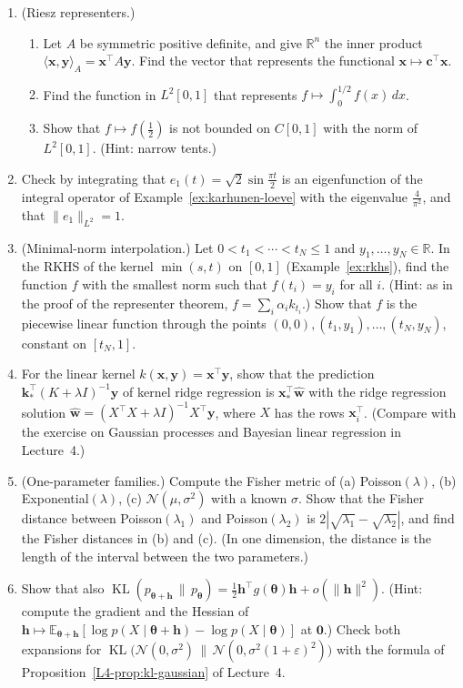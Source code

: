 \documentclass[11pt]{article}
\newcommand{\norm}[1]{\lVert #1 \rVert}
\newcommand{\ip}[2]{\langle #1, #2 \rangle}
\newcommand{\E}{\mathbb{E}}
\theoremstyle{definition}
\theoremstyle{plain}
\theoremstyle{remark}
\DeclareMathOperator{\KL}{KL}
\begin{document}
\begin{enumerate}[leftmargin=*]
    \item (Riesz representers.)
    \begin{enumerate}[label=(\alph*)]
        \item Let $A$ be symmetric positive definite, and give $\mathbb{R}^n$ the inner product $\ip{\mathbf{x}}{\mathbf{y}}_A = \mathbf{x}^\top A\mathbf{y}$. Find the vector that represents the functional $\mathbf{x} \mapsto \mathbf{c}^\top\mathbf{x}$.
        \item Find the function in $L^2[0, 1]$ that represents $f \mapsto \int_0^{1/2} f(x)\, dx$.
        \item Show that $f \mapsto f(\frac{1}{2})$ is not bounded on $C[0, 1]$ with the norm of $L^2[0, 1]$. (Hint: narrow tents.)
    \end{enumerate}
    \item Check by integrating that $e_1(t) = \sqrt{2}\sin\frac{\pi t}{2}$ is an eigenfunction of the integral operator of Example~\ref{ex:karhunen-loeve} with the eigenvalue $\frac{4}{\pi^2}$, and that $\norm{e_1}_{L^2} = 1$.
    \item (Minimal-norm interpolation.) Let $0 < t_1 < \cdots < t_N \leq 1$ and $y_1, \ldots, y_N \in \mathbb{R}$. In the RKHS of the kernel $\min(s, t)$ on $[0, 1]$ (Example~\ref{ex:rkhs}), find the function $f$ with the smallest norm such that $f(t_i) = y_i$ for all $i$. (Hint: as in the proof of the representer theorem, $f = \sum_i \alpha_ik_{t_i}$.) Show that $f$ is the piecewise linear function through the points $(0, 0), (t_1, y_1), \ldots, (t_N, y_N)$, constant on $[t_N, 1]$.
    \item For the linear kernel $k(\mathbf{x}, \mathbf{y}) = \mathbf{x}^\top\mathbf{y}$, show that the prediction $\mathbf{k}_*^\top(K + \lambda I)^{-1}\mathbf{y}$ of kernel ridge regression is $\mathbf{x}_*^\top\hat{\mathbf{w}}$ with the ridge regression solution $\hat{\mathbf{w}} = (X^\top X + \lambda I)^{-1}X^\top\mathbf{y}$, where $X$ has the rows $\mathbf{x}_i^\top$. (Compare with the exercise on Gaussian processes and Bayesian linear regression in Lecture~4.)
    \item (One-parameter families.) Compute the Fisher metric of (a) Poisson$(\lambda)$, (b) Exponential$(\lambda)$, (c) $\mathcal{N}(\mu, \sigma^2)$ with a known $\sigma$. Show that the Fisher distance between Poisson$(\lambda_1)$ and Poisson$(\lambda_2)$ is $2|\sqrt{\lambda_1} - \sqrt{\lambda_2}|$, and find the Fisher distances in (b) and (c). (In one dimension, the distance is the length of the interval between the two parameters.)
    \item\label{exer:kl-reverse} Show that also $\KL(p_{\boldsymbol{\theta} + \mathbf{h}} \,\|\, p_{\boldsymbol{\theta}}) = \frac{1}{2}\mathbf{h}^\top g(\boldsymbol{\theta})\mathbf{h} + o(\norm{\mathbf{h}}^2)$. (Hint: compute the gradient and the Hessian of $\mathbf{h} \mapsto \E_{\boldsymbol{\theta} + \mathbf{h}}[\log p(X \mid \boldsymbol{\theta} + \mathbf{h}) - \log p(X \mid \boldsymbol{\theta})]$ at $\mathbf{0}$.) Check both expansions for $\KL\big(\mathcal{N}(0, \sigma^2) \,\|\, \mathcal{N}(0, \sigma^2(1 + \varepsilon)^2)\big)$ with the formula of Proposition~\ref{L4-prop:kl-gaussian} of Lecture~4.

\end{enumerate}
\end{document}
